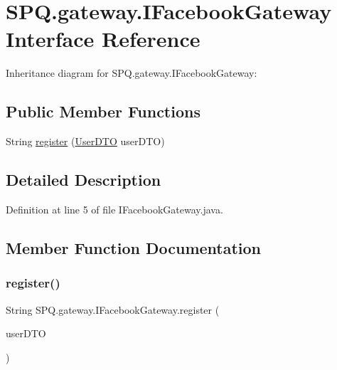 \hypertarget{interface_s_p_q_1_1gateway_1_1_i_facebook_gateway}{}\section{S\+P\+Q.\+gateway.\+I\+Facebook\+Gateway Interface Reference}
\label{interface_s_p_q_1_1gateway_1_1_i_facebook_gateway}


Inheritance diagram for S\+P\+Q.\+gateway.\+I\+Facebook\+Gateway\+:
\subsection*{Public Member Functions}
\begin{DoxyCompactItemize}
\item 
String \mbox{\hyperlink{interface_s_p_q_1_1gateway_1_1_i_facebook_gateway_adeef42315d68dc80ddf79bf4e1cbdeb0}{register}} (\mbox{\hyperlink{class_s_p_q_1_1dto_1_1_user_d_t_o}{User\+D\+TO}} user\+D\+TO)
\end{DoxyCompactItemize}


\subsection{Detailed Description}


Definition at line 5 of file I\+Facebook\+Gateway.\+java.



\subsection{Member Function Documentation}
\mbox{\label{interface_s_p_q_1_1gateway_1_1_i_facebook_gateway_adeef42315d68dc80ddf79bf4e1cbdeb0}} 
\subsubsection{\texorpdfstring{register()}{register()}}
{\footnotesize\ttfamily String S\+P\+Q.\+gateway.\+I\+Facebook\+Gateway.\+register (\begin{DoxyParamCaption}\item[{\mbox{\hyperlink{class_s_p_q_1_1dto_1_1_user_d_t_o}{User\+D\+TO}}}]{user\+D\+TO }\end{DoxyParamCaption})}



